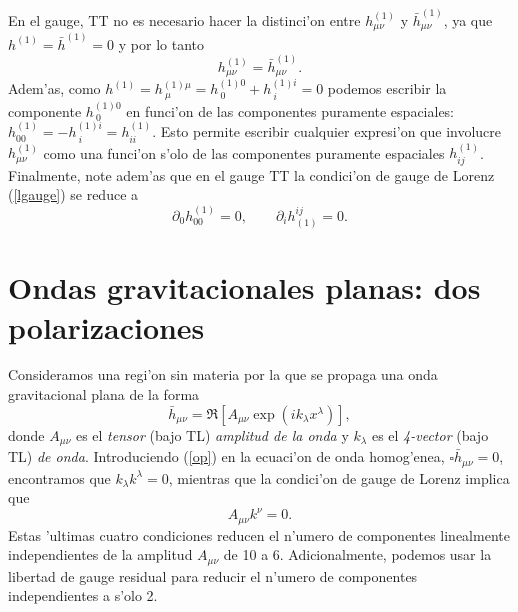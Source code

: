 En el gauge, TT no es necesario hacer la distinci'on entre $h^{(1)}_{\mu\nu}$ y $\bar{h}^{(1)}_{\mu\nu}$, ya que $h^{(1)}=\bar{h}^{(1)}=0$ y por lo tanto
\begin{equation}
h^{(1)}_{\mu\nu}=\bar{h}^{(1)}_{\mu\nu}.
\end{equation}
Adem'as, como $h^{(1)}=h^{(1)\mu}_{\ \mu}=h^{(1)0}_{\ 0}+h^{(1)i}_{\ i}=0$ podemos escribir la componente $h^{(1)0}_{\ 0}$ en funci'on de las componentes puramente espaciales: $h^{(1)}_{00}=-h^{(1)i}_{\ i}=h^{(1)}_{ii}$. Esto permite escribir cualquier expresi'on que involucre $h^{(1)}_{\mu\nu}$ como una funci'on s'olo de las componentes puramente espaciales $h^{(1)}_{ij}$. Finalmente, note adem'as que en el gauge TT la condici'on de gauge de Lorenz (\ref{lgauge}) se reduce a
\begin{equation}
\partial_0h^{(1)}_{00}=0, \qquad \partial_ih_{(1)}^{ij}=0. \label{dh00}
\end{equation}

\section{Ondas gravitacionales planas: dos polarizaciones}\label{sec:OGP}

Consideramos una regi'on sin materia por la que se propaga una onda gravitacional plana de la forma
\begin{equation}\label{op}
 \bar{h}_{\mu\nu}=\Re\left[A_{\mu\nu}\exp{(ik_\lambda x^\lambda)}\right],
\end{equation}
donde $A_{\mu\nu}$ es el \textit{tensor} (bajo TL) \textit{amplitud de la onda} y $k_\lambda$ es el \textit{4-vector} (bajo TL) \textit{de onda}. Introduciendo (\ref{op}) en la ecuaci'on de onda homog'enea, $\square\bar{h}_{\mu\nu}=0$, encontramos que $k_\lambda k^\lambda=0$, mientras que la condici'on de gauge de Lorenz implica que
\begin{equation}
 A_{\mu\nu}k^\nu=0. \label{glA}
\end{equation}
Estas 'ultimas cuatro condiciones reducen el n'umero de componentes linealmente independientes de la amplitud $A_{\mu\nu}$ de 10 a 6. Adicionalmente, podemos usar la libertad de gauge residual para reducir el n'umero de componentes independientes a s'olo 2.


